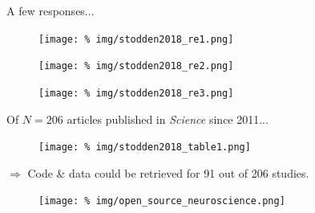 \begin{frame}{A few responses...}
  
  \begin{figure}
    \centering
    \texttt{[image: \%
      img/stodden2018\_re1.png]} %
  \end{figure}

  \begin{figure}
    \centering
    \texttt{[image: \%
      img/stodden2018\_re2.png]} %
  \end{figure}

  \begin{figure}
    \centering
    \texttt{[image: \%
      img/stodden2018\_re3.png]} %
  \end{figure}

  
\end{frame}



\begin{frame}{\large   Of $N=206$ articles published in \textit{Science} since 2011...}


  \begin{figure}
    \centering
    \texttt{[image: \%
      img/stodden2018\_table1.png]} %
  \end{figure}

  \vspace{0.1cm}
  
  \begin{center}
    $\Rightarrow$ Code \& data could be retrieved for 91 out of 206 studies.    
  \end{center}

  
\end{frame}


\begin{frame}{}%

  \begin{figure}
    \texttt{[image: \%
      img/open\_source\_neuroscience.png]} %
  \end{figure}
  
\end{frame}



